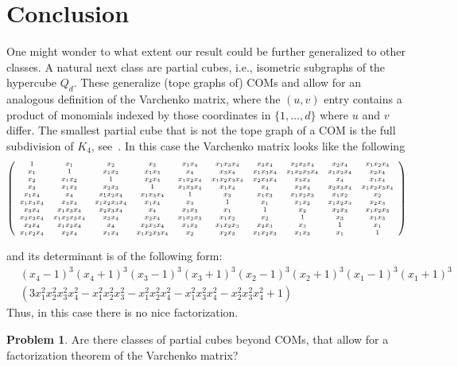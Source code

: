 \documentclass[12pt]{amsart}
\theoremstyle{plain}
\numberwithin{Lemma}{\DefaultNumberTheoremWithin}
\numberwithin{Claim}{\DefaultNumberTheoremWithin}
\numberwithin{Theorem}{\DefaultNumberTheoremWithin}
\numberwithin{Corollary}{\DefaultNumberTheoremWithin}
\numberwithin{Proposition}{\DefaultNumberTheoremWithin}
\numberwithin{Conjecture}{\DefaultNumberTheoremWithin}
\numberwithin{Situation}{\DefaultNumberTheoremWithin}
\numberwithin{Note}{\DefaultNumberTheoremWithin}
\theoremstyle{definition}
\numberwithin{Definition}{\DefaultNumberTheoremWithin}
\theoremstyle{definition}
\numberwithin{Question}{\DefaultNumberTheoremWithin}
\theoremstyle{definition}
\newtheorem{Problem}{Problem}
\numberwithin{Problem}{\DefaultNumberTheoremWithin}
\theoremstyle{remark} \newtheorem{Remark}{Remark}
\numberwithin{Remark}{\DefaultNumberTheoremWithin}
\theoremstyle{remark}
\numberwithin{Example}{\DefaultNumberTheoremWithin}
\numberwithin{Case}{Lemma}
\numberwithin{Step}{Lemma}
\begin{document}
\section{Conclusion}\label{sec:conclusions}
One might wonder to what extent our result could be further generalized to other classes. A natural next class are partial cubes, i.e., isometric subgraphs of the hypercube $Q_d$. These generalize (tope graphs of) COMs and allow for an analogous definition of the Varchenko matrix, where the $(u,v)$ entry contains a product of monomials indexed by those coordinates in $\{1,\ldots, d\}$ where $u$ and $v$ differ. The smallest partial cube that is not the tope graph of a COM is the full subdivision of $K_4$, see~\cite{KM}. In this case the Varchenko matrix looks like the following
\begin{align*}
\scriptsize
\left(\begin{array}{cccccccccc}
 1&x_1&x_2&x_3&x_1 x_4&x_1 x_3 x_4&x_3 x_4&x_2 x_3 x_4&x_2 x_4&x_1 x_2 x_4\\
 x_1&1&x_1 x_2&x_1 x_3&x_4&x_3 x_4&x_1 x_3 x_4&x_1 x_2 x_3 x_4&x_1 x_2 x_4&x_2 x_4\\ 
x_2&x_1 x_2&1&x_2 x_3&x_1 x_2 x_4&x_1 x_2 x_3 x_4&x_2 x_3 x_4&x_3 x_4&x_4&x_1 x_4\\
x_3&x_1 x_3&x_2 x_3&1&x_1 x_3 x_4&x_1 x_4&x_4&x_2 x_4&x_2 x_3 x_4&x_1 x_2 x_3 x_4\\ x_1 x_4&x_4&x_1 x_2 x_4&x_1 x_3 x_4&1&x_3&x_1 x_3&x_1 x_2 x_3&x_1 x_2&x_2\\
 x_1 x_3 x_4&x_3 x_4&x_1 x_2 x_3 x_4&x_1 x_4&x_3&1&x_1&x_1 x_2&x_1 x_2 x_3&x_2 x_3\\
x_3 x_4&x_1 x_3 x_4&x_2 x_3 x_4&x_4&x_1 x_3&x_1&1&x_2&x_2 x_3&x_1 x_2 x_3\\ x_2 x_3 x_4&x_1 x_2 x_3 x_4&x_3 x_4&x_2 x_4&x_1 x_2 x_3&x_1 x_2&x_2&1&x_3&x_1 x_3\\
x_2 x_4&x_1 x_2 x_4&x_4&x_2 x_3 x_4&x_1 x_2&x_1 x_2 x_3&x_2 x_3&x_3&1&x_1\\
 x_1 x_2 x_4&x_2 x_4&x_1 x_4&x_1 x_2 x_3 x_4&x_2&x_2 x_3&x_1 x_2 x_3&x_1 x_3&x_1&1
\end{array}\right)
\end{align*}


and its determinant is of the following form:
\begin{align*}
&(x_4 - 1)^3 (x_4 + 1)^3 (x_3 - 1)^3 (x_3 + 1)^3 (x_2 - 1)^3 (x_2 + 1)^3 (x_1 - 1)^3 (x_1 + 1)^3 \\ 
&(3 x_1^2 x_2^2 x_3^2 x_4^2 - x_1^2 x_2^2 x_3^2 - x_1^2 x_2^2 x_4^2 - x_1^2 x_3^2 x_4^2 - x_2^2 x_3^2 x_4^2 + 1)
\end{align*}
 Thus, in this case there is no nice factorization. 
\begin{Problem}
Are there classes of partial cubes beyond COMs, that allow for a factorization theorem of the Varchenko matrix? 
\end{Problem}
\end{document}
